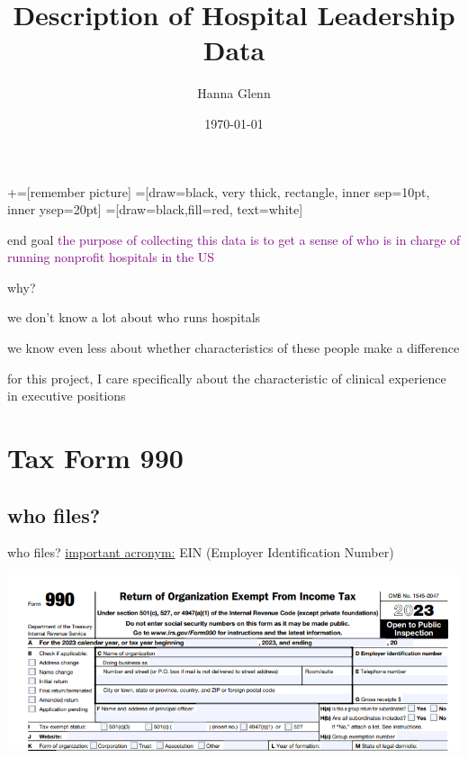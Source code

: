 \documentclass[notes,11pt, aspectratio=169]{beamer}
\title[]{\textcolor{sage}{Description of Hospital Leadership Data}}
\author[]{Hanna Glenn}
\date{\today}
\newenvironment{wideitemize}{\itemize\addtolength{\itemsep}{10pt}}{\enditemize}
\begin{document}
\newcommand\marktopleft[1]{%
    \tikz[overlay,remember picture] 
        \node (marker-#1-a) at (-.3em,.3em) {};%
}
\newcommand\markbottomright[2]{%
    \tikz[overlay,remember picture] 
        \node (marker-#1-b) at (0em,0em) {};%
}
+=[remember picture] 
 =[draw=black, very thick, rectangle, inner sep=10pt, inner ysep=20pt]
 =[draw=black,fill=red, text=white]

\begin{frame}
\maketitle
\end{frame}

\begin{frame}{end goal}
    \textcolor{purple}{the purpose of collecting this data is to get a sense of who is in charge of running nonprofit hospitals in the US}

    \vspace{10mm}

    why?
    \begin{wideitemize}
        \item we don't know a lot about who runs hospitals
        \item we know even less about whether characteristics of these people make a difference 
        \item for this project, I care specifically about the characteristic of clinical experience in executive positions
    \end{wideitemize}
\end{frame}


\section{Tax Form 990}

\subsection{who files?}

\begin{frame}{who files?}
\underline{important acronym:} EIN (Employer Identification Number)

    \centering
    \includegraphics[scale=.7]{Graphics/990_snip_frontpage.PNG}
\end{frame}
\end{document}
